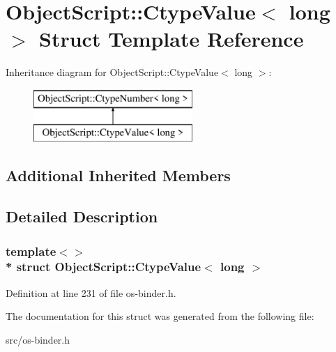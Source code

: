 \hypertarget{struct_object_script_1_1_ctype_value_3_01long_01_4}{}\section{Object\+Script\+:\+:Ctype\+Value$<$ long $>$ Struct Template Reference}
\label{struct_object_script_1_1_ctype_value_3_01long_01_4}
Inheritance diagram for Object\+Script\+:\+:Ctype\+Value$<$ long $>$\+:\begin{figure}[H]
\begin{center}
\leavevmode
\includegraphics[height=2.000000cm]{struct_object_script_1_1_ctype_value_3_01long_01_4}
\end{center}
\end{figure}
\subsection*{Additional Inherited Members}


\subsection{Detailed Description}
\subsubsection*{template$<$$>$\\*
struct Object\+Script\+::\+Ctype\+Value$<$ long $>$}



Definition at line 231 of file os-\/binder.\+h.



The documentation for this struct was generated from the following file\+:\begin{DoxyCompactItemize}
\item 
src/os-\/binder.\+h\end{DoxyCompactItemize}
